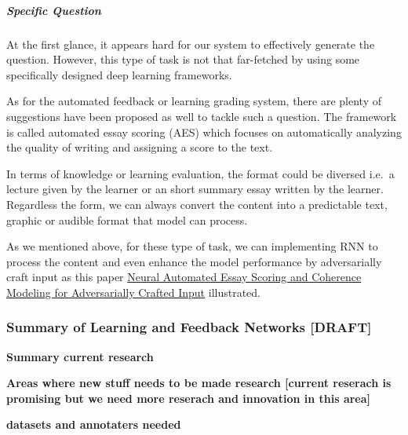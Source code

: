 \documentclass{acm_proc_article-sp}
\renewcommand{\paragraph}[1]{\vskip 6pt\noindent\textbf{#1 }}
\begin{document}
\subparagraph{Specific Question}\label{specific-question}

At the first glance, it appears hard for our system to effectively
generate the question. However, this type of task is not that
far-fetched by using some specifically designed deep learning
frameworks.

As for the automated feedback or learning grading system, there are
plenty of suggestions have been proposed as well to tackle such a
question. The framework is called automated essay scoring (AES) which
focuses on automatically analyzing the quality of writing and assigning
a score to the text.

In terms of knowledge or learning evaluation, the format could be
diversed i.e.~a lecture given by the learner or an short summary essay
written by the learner. Regardless the form, we can always convert the
content into a predictable text, graphic or audible format that model
can process.

As we mentioned above, for these type of task, we can implementing RNN
to process the content and even enhance the model performance by
adversarially craft input as this paper
\href{http://aclweb.org/anthology/N18-1024}{Neural Automated Essay
Scoring and Coherence Modeling for Adversarially Crafted Input}
illustrated.

\subsubsection{Summary of Learning and Feedback Networks
{[}DRAFT{]}}\label{summary-of-learning-and-feedback-networks-draft}

\paragraph{Summary current research}\label{summary-current-research}

\paragraph{Areas where new stuff needs to be made research {[}current
reserach is promising but we need more reserach and innovation in this
area{]}}\label{areas-where-new-stuff-needs-to-be-made-research-current-reserach-is-promising-but-we-need-more-reserach-and-innovation-in-this-area}

\paragraph{datasets and annotaters
needed}\label{datasets-and-annotaters-needed}
\end{document}
